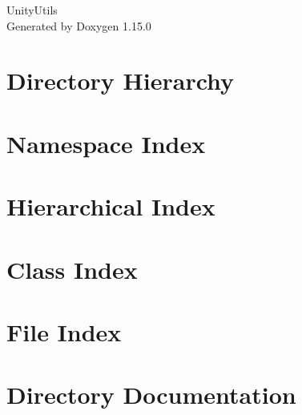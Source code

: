 \documentclass[twoside]{book}
\newcommand{\+}{\discretionary{\mbox{\scriptsize$\hookleftarrow$}}{}{}}
\newcommand{\clearemptydoublepage}{%
    \newpage{\pagestyle{empty}\cleardoublepage}%
  }
\begin{document}
  \raggedbottom
    \hypersetup{pageanchor=false,
                bookmarksnumbered=true,
                pdfencoding=unicode
               }
  \begin{titlepage}
  \vspace*{7cm}
  \begin{center}%
  {\Large Unity\+Utils}\\
  \vspace*{1cm}
  {\large Generated by Doxygen 1.15.0}\\
  \end{center}
  \end{titlepage}
  \clearemptydoublepage
  \tableofcontents
  \clearemptydoublepage
  \hypersetup{pageanchor=true}
\chapter{Directory Hierarchy}

\chapter{Namespace Index}

\chapter{Hierarchical Index}

\chapter{Class Index}

\chapter{File Index}

\chapter{Directory Documentation}












\end{document}
